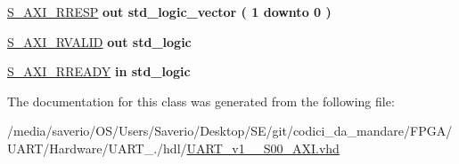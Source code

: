 \begin{DoxyCompactItemize}
\item 
\mbox{\label{classUART__v1__0__S00__AXI_a67ba85504b4c51fb0eb00d18fd70ad92}} 
\hyperlink{classUART__v1__0__S00__AXI_a67ba85504b4c51fb0eb00d18fd70ad92}{S\+\_\+\+A\+X\+I\+\_\+\+R\+R\+E\+SP}  {\bfseries {\bfseries \textcolor{vhdlchar}{out}\textcolor{vhdlchar}{ }}} {\bfseries \textcolor{vhdlchar}{std\+\_\+logic\+\_\+vector}\textcolor{vhdlchar}{ }\textcolor{vhdlchar}{(}\textcolor{vhdlchar}{ }\textcolor{vhdlchar}{ } \textcolor{vhdldigit}{1} \textcolor{vhdlchar}{ }\textcolor{vhdlchar}{downto}\textcolor{vhdlchar}{ }\textcolor{vhdlchar}{ } \textcolor{vhdldigit}{0} \textcolor{vhdlchar}{ }\textcolor{vhdlchar}{)}\textcolor{vhdlchar}{ }} 
\item 
\mbox{\label{classUART__v1__0__S00__AXI_a31f4e92d27c2c2005ee5f368a8249604}} 
\hyperlink{classUART__v1__0__S00__AXI_a31f4e92d27c2c2005ee5f368a8249604}{S\+\_\+\+A\+X\+I\+\_\+\+R\+V\+A\+L\+ID}  {\bfseries {\bfseries \textcolor{vhdlchar}{out}\textcolor{vhdlchar}{ }}} {\bfseries \textcolor{vhdlchar}{std\+\_\+logic}\textcolor{vhdlchar}{ }} 
\item 
\mbox{\label{classUART__v1__0__S00__AXI_a5850bf8f42acdf01938057507dc703b7}} 
\hyperlink{classUART__v1__0__S00__AXI_a5850bf8f42acdf01938057507dc703b7}{S\+\_\+\+A\+X\+I\+\_\+\+R\+R\+E\+A\+DY}  {\bfseries {\bfseries \textcolor{vhdlchar}{in}\textcolor{vhdlchar}{ }}} {\bfseries \textcolor{vhdlchar}{std\+\_\+logic}\textcolor{vhdlchar}{ }} 
\end{DoxyCompactItemize}


The documentation for this class was generated from the following file\+:\begin{DoxyCompactItemize}
\item 
/media/saverio/\+O\+S/\+Users/\+Saverio/\+Desktop/\+S\+E/git/codici\+\_\+da\+\_\+mandare/\+F\+P\+G\+A/\+U\+A\+R\+T/\+Hardware/\+U\+A\+R\+T\+\_./hdl/\hyperlink{UART__v1__0__S00__AXI_8vhd}{U\+A\+R\+T\+\_\+v1\+\_\+\_\+\+S00\+\_\+\+A\+X\+I.\+vhd}\end{DoxyCompactItemize}

